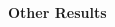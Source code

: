 \documentclass[portrait,a0b,final,a4resizeable]{include/a0poster}
\begin{document}
\begin{poster}
\begin{multicols}{2}
%
%
%

\end{multicols}


\vspace*{2.6cm}

\begin{center}
\begin{pcolumn}{1.03}

{}
{
  \begin{center}
    {\sffamily \VeryHuge \textbf{Other Results}}
  \end{center}
}
\end{pcolumn}
\end{center}




\begin{multicols}{2}




\end{multicols}
\end{poster}
\end{document}
